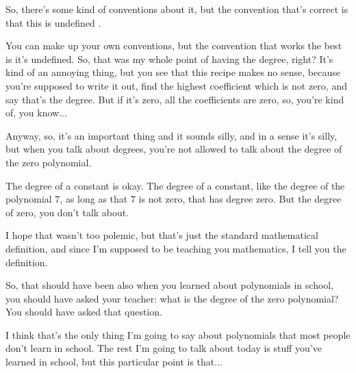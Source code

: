\begin{speech}[00:25:16 - 00:26:46]
So, there's some kind of conventions about it, but the convention that's correct is that this is undefined .

You can make up your own conventions, but the convention that works the best is it's undefined. So, that was my whole point of having the degree, right? It's kind of an annoying thing, but you see that this recipe makes no sense, because you're supposed to write it out, find the highest coefficient which is not zero, and say that's the degree. But if it's zero, all the coefficients are zero, so, you're kind of, you know...

Anyway, so, it's an important thing and it sounds silly, and in a sense it's silly, but when you talk about degrees, you're not allowed to talk about the degree of the zero polynomial.

The degree of a constant is okay. The degree of a constant, like the degree of the polynomial $7$, as long as that $7$ is not zero, that has degree zero. But the degree of zero, you don't talk about.
\end{speech}

\begin{speech}[00:26:46 - 00:27:36]
I hope that wasn't too polemic, but that's just the standard mathematical definition, and since I'm supposed to be teaching you mathematics, I tell you the definition.

So, that should have been also when you learned about polynomials in school, you should have asked your teacher: what is the degree of the zero polynomial? You should have asked that question. 

I think that's the only thing I'm going to say about polynomials that most people don't learn in school. The rest I'm going to talk about today is stuff you've learned in school, but this particular point is that...
\end{speech}

\begin{content}
\end{content}

